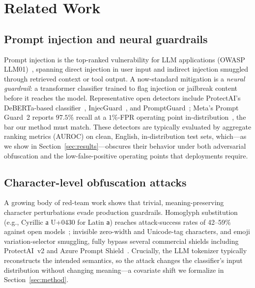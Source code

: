 \section{Related Work}\label{sec:related}

\subsection{Prompt injection and neural guardrails}
Prompt injection is the top-ranked vulnerability for LLM applications
(OWASP LLM01)~\cite{owasp2025}, spanning direct injection in user input and
indirect injection smuggled through retrieved context or tool output.
A now-standard mitigation is a \emph{neural guardrail}: a transformer classifier
trained to flag injection or jailbreak content before it reaches the model.
Representative open detectors include ProtectAI's DeBERTa-based
classifier~\cite{protectai2024}, InjecGuard~\cite{injecguard2024}, and
PromptGuard~\cite{promptguard2025}; Meta's Prompt Guard~2 reports $97.5\%$ recall
at a $1\%$-FPR operating point in-distribution~\cite{metapromptguard2}, the bar our
method must match. These detectors are typically evaluated by
aggregate ranking metrics (AUROC) on clean, English, in-distribution test sets,
which---as we show in Section~\ref{sec:results}---obscures their behavior under
both adversarial obfuscation and the low-false-positive operating points that
deployments require.

\subsection{Character-level obfuscation attacks}
A growing body of red-team work shows that trivial, meaning-preserving character
perturbations evade production guardrails. Homoglyph substitution (e.g., Cyrillic
\foreignlanguage{russian}{а} U+0430 for Latin \texttt{a}) reaches attack-success
rates of 42--59\% against open models~\cite{elastic2025homoglyph}; invisible
zero-width and Unicode-tag characters, and emoji variation-selector smuggling,
fully bypass several commercial shields including ProtectAI~v2 and Azure Prompt
Shield~\cite{mindgard2025invisible,csa2026unicode}. Crucially, the LLM tokenizer
typically reconstructs the intended semantics, so the attack changes the
classifier's input distribution without changing meaning---a covariate shift we
formalize in Section~\ref{sec:method}.


